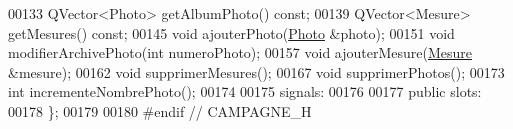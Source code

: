 \begin{DoxyCode}
00133     QVector<Photo> getAlbumPhoto() \textcolor{keyword}{const};
00139     QVector<Mesure> getMesures() \textcolor{keyword}{const};
00145     \textcolor{keywordtype}{void} ajouterPhoto(\hyperlink{struct_photo}{Photo} &photo);
00151     \textcolor{keywordtype}{void} modifierArchivePhoto(\textcolor{keywordtype}{int} numeroPhoto);
00157     \textcolor{keywordtype}{void} ajouterMesure(\hyperlink{struct_mesure}{Mesure} &mesure);
00162     \textcolor{keywordtype}{void} supprimerMesures();
00167     \textcolor{keywordtype}{void} supprimerPhotos();
00173     \textcolor{keywordtype}{int} incrementeNombrePhoto();
00174 
00175 signals:
00176 
00177 \textcolor{keyword}{public} slots:
00178 \};
00179 
00180 \textcolor{preprocessor}{#endif // CAMPAGNE\_H}
\end{DoxyCode}
